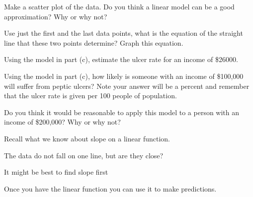 \begin{activity}
\item Make a scatter plot of the data.  Do you think a linear model can be a good
    approximation?  Why or why not?

\item Use just the first and the last data points, what is the equation of the straight
    line that these two points determine?  Graph this equation.

\item Using the model in part (c), estimate the ulcer rate for an income of \$26000.

\item Using the model in part (c), how likely is someone with an income of \$100,000 will
    suffer from peptic ulcers?  Note your answer will be a percent and remember that the
    ulcer rate is given per 100 people of population.

\item Do you think it would be reasonable to apply this model to a person with an income
    of \$200,000?  Why or why not?
\ea
\end{activity}
\begin{smallhint}
   \ba
        \item Recall what we know about slope on a linear function.
        \item The data do not fall on one line, but are they close?
        \item It might be best to find slope first
        \item Once you have the linear function you can use it to make predictions.
        \item 
        \item
   \ea
\end{smallhint}
\begin{bighint}
   \ba
        \item
        \item
        \item
        \item
        \item
        \item
   \ea
\end{bighint}
\begin{activitySolution}
   \ba
        \item 
        \item
        \item
        \item
        \item
        \item
   \ea
\end{activitySolution}
\aftera
